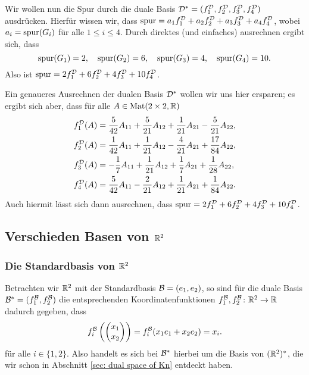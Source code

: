 \documentclass[a4paper,10pt]{article}
\begin{document}
Wir wollen nun die Spur durch die duale Basis $\mathcal{D}^* = (f^{\mathcal{D}}_1, f^{\mathcal{D}}_2, f^{\mathcal{D}}_3, f^{\mathcal{D}}_4)$ ausdrücken. Hierfür wissen wir, dass $\mathrm{spur} = a_1 f^{\mathcal{D}}_1 + a_2 f^{\mathcal{D}}_2 + a_3 f^{\mathcal{D}}_3 + a_4 f^{\mathcal{D}}_4$, wobei $a_i = \mathrm{spur}(G_i)$ für alle $1 \leq i \leq 4$. Durch direktes (und einfaches) ausrechnen ergibt sich, dass
\[
 \mathrm{spur}(G_1) = 2, \quad
 \mathrm{spur}(G_2) = 6, \quad
 \mathrm{spur}(G_3) = 4, \quad
 \mathrm{spur}(G_4) = 10.
\]
Also ist $\mathrm{spur} = 2 f^{\mathcal{D}}_1 + 6 f^{\mathcal{D}}_2 + 4 f^{\mathcal{D}}_3 + 10 f^{\mathcal{D}}_4$.

Ein genaueres Ausrechnen der dualen Basis $\mathcal{D}^*$ wollen wir uns hier ersparen; es ergibt sich aber, dass für alle $A \in \mathrm{Mat}(2 \times 2, \mathbb{R})$
\begin{align*}
 f^{\mathcal{D}}_1(A) &= \frac{5}{42} A_{11} + \frac{5}{21} A_{12} + \frac{1}{21} A_{21} -\frac{5}{21} A_{22}, \\
 f^{\mathcal{D}}_2(A) &= \frac{1}{42} A_{11} + \frac{1}{21} A_{12} - \frac{4}{21} A_{21} + \frac{17}{84} A_{22}, \\
 f^{\mathcal{D}}_3(A) &= -\frac{1}{7} A_{11} + \frac{1}{21} A_{12} + \frac{1}{7} A_{21} + \frac{1}{28} A_{22}, \\
 f^{\mathcal{D}}_4(A) &= \frac{5}{42} A_{11} - \frac{2}{21} A_{12} + \frac{1}{21} A_{21} + \frac{1}{84} A_{22}.
\end{align*}
Auch hiermit lässt sich dann ausrechnen, dass $\mathrm{spur} = 2 f^{\mathcal{D}}_1 + 6 f^{\mathcal{D}}_2 + 4 f^{\mathcal{D}}_3 + 10 f^{\mathcal{D}}_4$.





\subsection{Verschieden Basen von $\mathbb{R}^2$}



\subsubsection{Die Standardbasis von $\mathbb{R}^2$}
Betrachten wir $\mathbb{R}^2$ mit der Standardbasis $\mathcal{B} = (e_1, e_2)$, so sind für die duale Basis $\mathcal{B}^* = (f^{\mathcal{B}}_1, f^{\mathcal{B}}_2)$ die entsprechenden Koordinatenfunktionen $f^{\mathcal{B}}_1, f^{\mathcal{B}}_2 \colon \mathbb{R}^2 \to \mathbb{R}$ dadurch gegeben, dass
\[
 f^{\mathcal{B}}_i\left( \begin{pmatrix} x_1 \\ x_2 \end{pmatrix} \right)
 = f^{\mathcal{B}}_i(x_1 e_1 + x_2 e_2) = x_i.
\]
für alle $i \in \{1,2\}$. Also handelt es sich bei $\mathcal{B}^*$ hierbei um die Basis von $(\mathbb{R}^2)^*$, die wir schon in Abschnitt \ref{sec: dual space of Kn} entdeckt haben.
\end{document}
